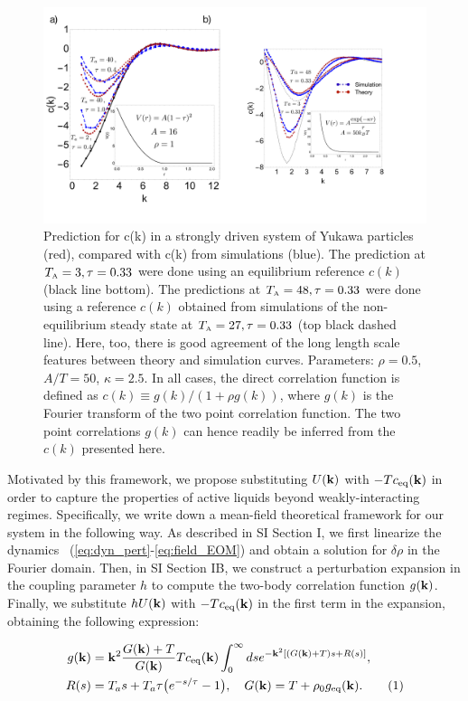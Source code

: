 \documentclass[superscriptaddress, twocolumn, prl, longbibliography, nofootinbib]{revtex4-1}
\newcommand{\A}{\text{\tiny{A}}}
\newcommand{\T}{T}
\newcommand\numberthis{\addtocounter{equation}{1}\tag{\theequation}}
\begin{document}
\begin{figure}
    \includegraphics[scale=0.355, clip=True]{Fig1b_cut.pdf}
    \caption{Prediction for c(k) in a strongly driven system of Yukawa particles (red), compared with c(k) from simulations (blue). The prediction at $T_\A=3,\tau=0.33$ were done using an equilibrium reference $c(k)$ (black line bottom). The predictions at $T_\A=48, \tau=0.33$ were done using a reference $c(k)$ obtained from simulations of the non-equilibrium steady state at $T_\A=27, \tau=0.33$ (top black dashed line). Here, too, there is good agreement of the long length scale features  between theory and simulation curves. Parameters: $\rho = 0.5$, $A/T = 50$, $\kappa=2.5$. In all cases, the direct correlation function is defined as $c(k)\equiv g(k)/(1+\rho g(k))$, where $g(k)$ is the Fourier transform of the two point correlation function. The two point correlations $g(k)$ can hence readily be inferred from the $c(k)$ presented here.}
    \label{Fig:1b}
\end{figure}

Motivated by this framework, we propose substituting $U({\bf k})$ with $- T c_{\rm eq}({\bf k})$ in order to capture the properties of active liquids beyond weakly-interacting regimes. Specifically, we write down a mean-field theoretical framework for our system in the following way. As described in SI Section I, we first linearize the dynamics ~(\ref{eq:dyn_pert}-\ref{eq:field_EOM}) and obtain a solution for $\delta \rho$ in the Fourier domain. Then, in SI Section IB, we construct a perturbation expansion in the coupling parameter $h$ to compute the two-body correlation function $g({\bf k})$. Finally, we substitute $h U({\bf k})$ with $- T c_{\rm eq}({\bf k})$ in the first term in the expansion, obtaining the following expression: 

\begin{align*}\label{eq:final_expression_gr}
    g({\bf k}) &= {\bf k}^2 \dfrac{ G({\bf k}) + \T}{G({\bf k})} T c_{\rm eq}({\bf k}) \int_0^\infty ds e^{-{\bf k}^2 [ (G({\bf k}) + \T)s + R(s) ]} ,
    \\
    R(s) &= \T_a s +  \T_a \tau \big(e^{-s/\tau}-1\big) ,
    \quad
    G({\bf k}) =  T +\rho_0 g_{\rm eq}({\bf k}) .
    \numberthis
\end{align*}
\end{document}
